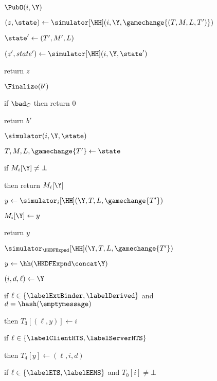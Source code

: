 \begin{figure}[tp]
	\begin{minipage}[t]{0.48\textwidth}
	
	\begin{algorithm}{$\PubO(i,\Y)$}
		\item $(z, \state) \gets \simulator[\HH] (i,\Y, \gamechange{(T, M, L, T')})$
		\item $\state' \gets (T', M', L)$
		\item $(z', state') \gets\simulator[\HH](i, \Y, \state')$
		\item return $z$
	\end{algorithm}
	\ExptSepSpace
	\begin{algorithm}{$\Finalize(b')$}
		\item if $\bad_C$ then return $0$
		\item {}
		\item return $b'$
	\end{algorithm}
	\ExptSepSpace			
	\begin{oracle}{$\simulator(i, \Y,\state)$}
		\item $T, M, L, \gamechange{T'} \gets \state$
		\item if $M_{i}[\Y] \neq \bot$
		\item \quad then return $M_{i}[\Y]$
		\item $y \gets \simulator_{i}[\HH](\Y, T,L, \gamechange{T'})$
		\item $M_{i}[\Y]\gets y$
		\item return $y$
	\end{oracle}
\end{minipage}
\begin{minipage}[t]{0.49\textwidth}
	\ExptSepSpace
	\begin{oracle}{$\simulator_{\HKDFExpnd}[\HH](\Y, T, L, \gamechange{T'})$}
		\item $y \gets \hh(\HKDFExpnd\concat\Y)$
		\item $(i, d, \ell) \gets \Y$
		\item if $\ell \in \{\labelExtBinder, \labelDerived\}$ and $d = \hash(\emptymessage)$
		\item \quad then $T_{3}[(\ell,y)] \gets i$
		\item if $\ell \in \{\labelClientHTS, \labelServerHTS\}$
		\item \quad then $T_{4}[y] \gets (\ell, i, d)$
		\item	
		\item if $\ell \in \{\labelETS, \labelEEMS\}$ and $T_{0}[i] \neq \bot$

\end{oracle}
\end{minipage}
\end{figure}
